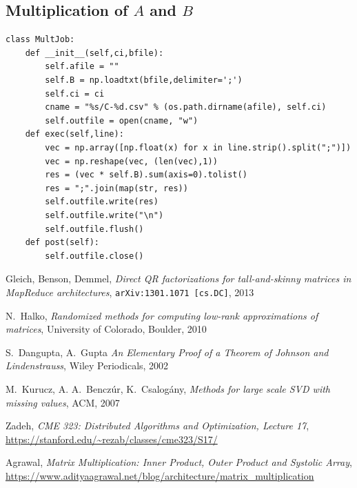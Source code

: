 \documentclass{article}
\begin{document}
\subsection{Multiplication of $A$ and $B$}

\begin{verbatim}
class MultJob:
    def __init__(self,ci,bfile):
        self.afile = ""
        self.B = np.loadtxt(bfile,delimiter=';')
        self.ci = ci
        cname = "%s/C-%d.csv" % (os.path.dirname(afile), self.ci)
        self.outfile = open(cname, "w")        
    def exec(self,line):        
        vec = np.array([np.float(x) for x in line.strip().split(";")])
        vec = np.reshape(vec, (len(vec),1))
        res = (vec * self.B).sum(axis=0).tolist()  
        res = ";".join(map(str, res))
        self.outfile.write(res)
        self.outfile.write("\n")
        self.outfile.flush()
    def post(self):
        self.outfile.close()
\end{verbatim}


  

\begin{thebibliography}{1}

Gleich, Benson, Demmel, \emph{Direct QR factorizations for tall-and-skinny
  matrices in MapReduce architectures}, {\tt arXiv:1301.1071 [cs.DC]}, 2013

N.~Halko, \emph{Randomized methods for computing low-rank approximations of
  matrices}, University of Colorado, Boulder, 2010

S.~Dangupta, A.~Gupta \emph{An Elementary Proof of a Theorem of Johnson and
  Lindenstrauss}, Wiley Periodicals, 2002

M.~Kurucz, A. A.~Benczúr, K.~Csalogány, \emph{Methods for large scale SVD with
missing values}, ACM, 2007

Zadeh, \emph{CME 323: Distributed Algorithms and Optimization, Lecture 17}, 
\url{https://stanford.edu/~rezab/classes/cme323/S17/}

Agrawal, \emph{Matrix Multiplication: Inner Product, Outer Product and Systolic Array},
\url{https://www.adityaagrawal.net/blog/architecture/matrix_multiplication}
  
\end{thebibliography}
\end{document}
